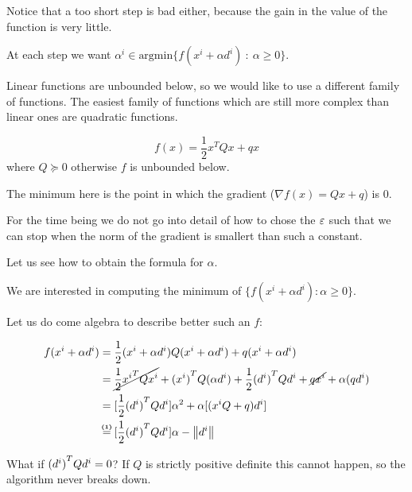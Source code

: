 \documentclass[computationalMathematics.tex]{subfiles}
\begin{document}
Notice that a too short step is bad either, because the gain in the value of the function is very little.

At each step we want $\alpha^i \in \mbox{argmin} \{f(x^i + \alpha d^i)~:~\alpha \geq 0\}$.

Linear functions are unbounded below, so we would like to use a different family of functions. The easiest family of functions which are still more complex than linear ones are quadratic functions.

\[
  f(x) = \frac{1}{2} x^T Q x + q x
\]
where $Q \succeq 0$ otherwise $f$ is unbounded below.

The minimum here is the point in which the gradient ($\nabla f(x) = Qx + q$) is $0$.


For the time being we do not go into detail of how to chose the $\varepsilon$ such that we can stop when the norm of the gradient is smallert than such a constant.

Let us see how to obtain the formula for $\alpha$.

We are interested in computing the minimum of $\{ f(x^i + \alpha d^i) : \alpha \ge 0\}$.

Let us do come algebra to describe better such an $f$:

\begin{equation}
  \begin{split}
    f(x^i + \alpha d^i) &= \frac{1}{2} (x^i + \alpha d^i) Q (x^i + \alpha d^i) + q (x^i + \alpha d^i)\\
    &= \cancel{\frac{1}{2} \tr{x^i}Q x^i}  + \tr{(x^i)} Q (\alpha d^i) + \frac{1}{2} \tr{(d^i)} Q d^i + \cancel{q x^i} + \alpha (q d^i)\\
    &= [\frac{1}{2} \tr{(d^i)} Q d^i] \alpha^2  + \alpha [(x^i Q + q) d^i]\\
    &\numeq{(1)} [\frac{1}{2} \tr{(d^i)} Q d^i] \alpha  - \norm{d^i}\\
  \end{split}
\end{equation}

What if ${(d^i)}^{T} Q d^i = 0$? If $Q$ is strictly positive definite this cannot happen, so the algorithm never breaks down.
\end{document}
